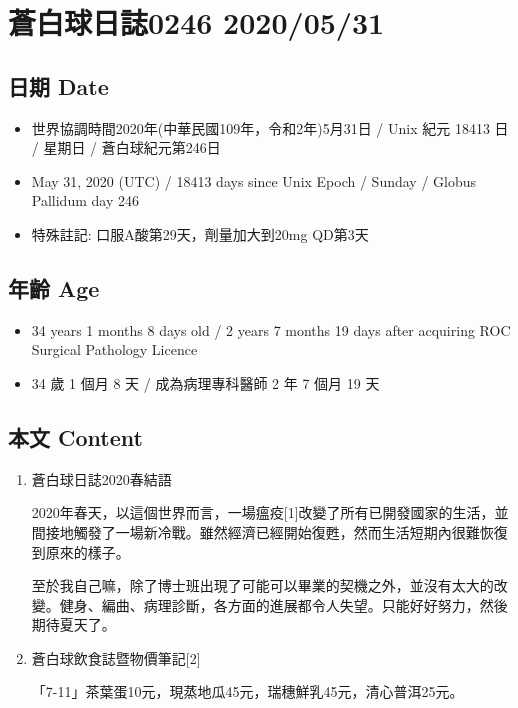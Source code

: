 \documentclass[a5paper, 12pt
]{book}
\providecommand{\tightlist}{%
  \setlength{\itemsep}{0pt}\setlength{\parskip}{0pt}}
\begin{document}
\hypertarget{ux84bcux767dux7403ux65e5ux8a8c0246-20200531}{%
\section{蒼白球日誌0246
2020/05/31}\label{ux84bcux767dux7403ux65e5ux8a8c0246-20200531}}

\hypertarget{ux65e5ux671f-date-91}{%
\subsection{日期 Date}\label{ux65e5ux671f-date-91}}

\begin{itemize}
\tightlist
\item
  世界協調時間2020年(中華民國109年，令和2年)5月31日 / Unix 紀元 18413 日
  / 星期日 / 蒼白球紀元第246日
\item
  May 31, 2020 (UTC) / 18413 days since Unix Epoch / Sunday / Globus
  Pallidum day 246
\item
  特殊註記: 口服A酸第29天，劑量加大到20mg QD第3天
\end{itemize}

\hypertarget{ux5e74ux9f61-age-91}{%
\subsection{年齡 Age}\label{ux5e74ux9f61-age-91}}

\begin{itemize}
\tightlist
\item
  34 years 1 months 8 days old / 2 years 7 months 19 days after
  acquiring ROC Surgical Pathology Licence
\item
  34 歲 1 個月 8 天 / 成為病理專科醫師 2 年 7 個月 19 天
\end{itemize}

\hypertarget{ux672cux6587-content-91}{%
\subsection{本文 Content}\label{ux672cux6587-content-91}}

\begin{enumerate}
\def\labelenumi{\arabic{enumi}.}
\item
  蒼白球日誌2020春結語

  2020年春天，以這個世界而言，一場瘟疫{[}1{]}改變了所有已開發國家的生活，並間接地觸發了一場新冷戰。雖然經濟已經開始復甦，然而生活短期內很難恢復到原來的樣子。

  至於我自己嘛，除了博士班出現了可能可以畢業的契機之外，並沒有太大的改變。健身、編曲、病理診斷，各方面的進展都令人失望。只能好好努力，然後期待夏天了。
\item
  蒼白球飲食誌暨物價筆記{[}2{]}

  「7-11」茶葉蛋10元，現蒸地瓜45元，瑞穗鮮乳45元，清心普洱25元。
\end{enumerate}
\end{document}
